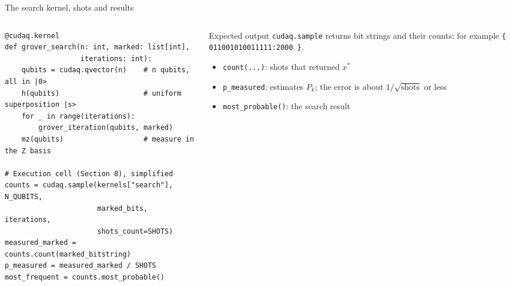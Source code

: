 \documentclass[aspectratio=169,11pt]{beamer}
\newcommand{\xs}{x^\ast}
\begin{document}
\begin{frame}[fragile]{The search kernel, shots and results}
  \begin{columns}[T]
    \begin{column}{0.58\textwidth}
\begin{lstlisting}
@cudaq.kernel
def grover_search(n: int, marked: list[int],
                  iterations: int):
    qubits = cudaq.qvector(n)    # n qubits, all in |0>
    h(qubits)                    # uniform superposition |s>
    for _ in range(iterations):
        grover_iteration(qubits, marked)
    mz(qubits)                   # measure in the Z basis

# Execution cell (Section 8), simplified
counts = cudaq.sample(kernels["search"], N_QUBITS,
                      marked_bits, iterations,
                      shots_count=SHOTS)
measured_marked = counts.count(marked_bitstring)
p_measured = measured_marked / SHOTS
most_frequent = counts.most_probable()
\end{lstlisting}
    \end{column}
    \begin{column}{0.39\textwidth}
      \small
      \begin{block}{Expected output}
        \texttt{cudaq.sample} returns bit strings and their counts: for example \texttt{\{ 011001010011111:2000 \}}.
      \end{block}
      \begin{itemize}
        \item \texttt{count(...)}: shots that returned $\xs$
        \item \texttt{p\_measured}: estimates $P_k$; the error is about $1/\sqrt{\text{shots}}$ or less
        \item \texttt{most\_probable()}: the search result
      \end{itemize}
    \end{column}
  \end{columns}
\end{frame}
\end{document}
